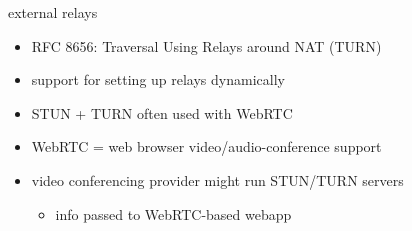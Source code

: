 \begin{frame}{external relays}
    \begin{itemize}
    \item RFC 8656: Traversal Using Relays around NAT (TURN)
    \item support for setting up relays dynamically
    \vspace{.5cm}
    \item STUN + TURN often used with WebRTC
    \item WebRTC = web browser video/audio-conference support
    \item video conferencing provider might run STUN/TURN servers
        \begin{itemize}
        \item info passed to WebRTC-based webapp
        \end{itemize}
    \end{itemize}
\end{frame}

